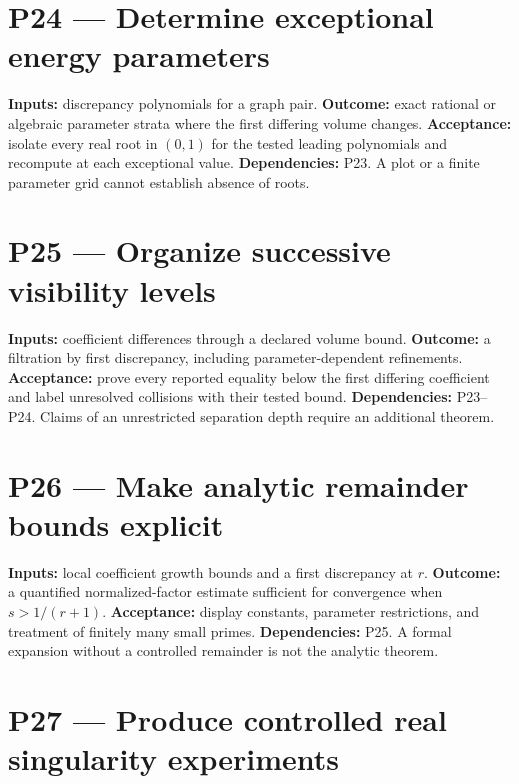\documentclass[
  11pt,
  a4paper,
]{report}
\begin{document}
\hypertarget{p24-determine-exceptional-energy-parameters}{%
\section{P24 --- Determine exceptional energy
parameters}\label{p24-determine-exceptional-energy-parameters}}

\textbf{Inputs:} discrepancy polynomials for a graph pair.
\textbf{Outcome:} exact rational or algebraic parameter strata where the
first differing volume changes. \textbf{Acceptance:} isolate every real
root in \((0,1)\) for the tested leading polynomials and recompute at
each exceptional value. \textbf{Dependencies:} P23. A plot or a finite
parameter grid cannot establish absence of roots.

\hypertarget{p25-organize-successive-visibility-levels}{%
\section{P25 --- Organize successive visibility
levels}\label{p25-organize-successive-visibility-levels}}

\textbf{Inputs:} coefficient differences through a declared volume
bound. \textbf{Outcome:} a filtration by first discrepancy, including
parameter-dependent refinements. \textbf{Acceptance:} prove every
reported equality below the first differing coefficient and label
unresolved collisions with their tested bound. \textbf{Dependencies:}
P23--P24. Claims of an unrestricted separation depth require an
additional theorem.

\hypertarget{p26-make-analytic-remainder-bounds-explicit}{%
\section{P26 --- Make analytic remainder bounds
explicit}\label{p26-make-analytic-remainder-bounds-explicit}}

\textbf{Inputs:} local coefficient growth bounds and a first discrepancy
at \(r\). \textbf{Outcome:} a quantified normalized-factor estimate
sufficient for convergence when \(s>1/(r+1)\). \textbf{Acceptance:}
display constants, parameter restrictions, and treatment of finitely
many small primes. \textbf{Dependencies:} P25. A formal expansion
without a controlled remainder is not the analytic theorem.

\hypertarget{p27-produce-controlled-real-singularity-experiments}{%
\section{P27 --- Produce controlled real singularity
experiments}\label{p27-produce-controlled-real-singularity-experiments}}
\end{document}
